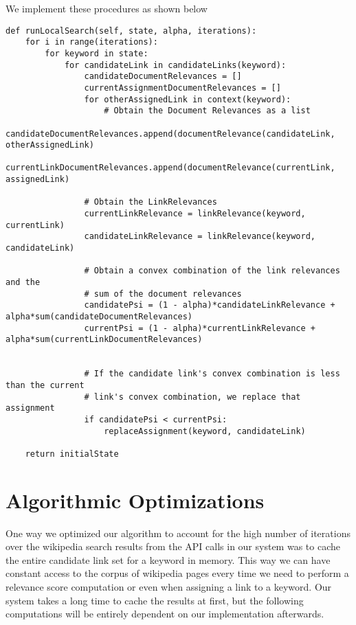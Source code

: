 \documentclass[twoside,11pt]{article}
\begin{document}
We implement these procedures as shown below

\begin{lstlisting}
def runLocalSearch(self, state, alpha, iterations):
    for i in range(iterations):
        for keyword in state:
            for candidateLink in candidateLinks(keyword):
                candidateDocumentRelevances = []
                currentAssignmentDocumentRelevances = []
                for otherAssignedLink in context(keyword):
                    # Obtain the Document Relevances as a list
                    candidateDocumentRelevances.append(documentRelevance(candidateLink, otherAssignedLink)
                    currentLinkDocumentRelevances.append(documentRelevance(currentLink, assignedLink)

                # Obtain the LinkRelevances
                currentLinkRelevance = linkRelevance(keyword, currentLink)
                candidateLinkRelevance = linkRelevance(keyword, candidateLink)

                # Obtain a convex combination of the link relevances and the
                # sum of the document relevances
                candidatePsi = (1 - alpha)*candidateLinkRelevance + alpha*sum(candidateDocumentRelevances)
                currentPsi = (1 - alpha)*currentLinkRelevance + alpha*sum(currentLinkDocumentRelevances)


                # If the candidate link's convex combination is less than the current
                # link's convex combination, we replace that assignment
                if candidatePsi < currentPsi:
                    replaceAssignment(keyword, candidateLink)

    return initialState
\end{lstlisting}

\section{Algorithmic Optimizations}

One way we optimized our algorithm to account for the high number of iterations over the wikipedia search results from the API calls in our system was to cache the entire candidate link set for a keyword in memory. This way we can have constant access to the corpus of wikipedia pages every time we need to perform a relevance score computation or even when assigning a link to a keyword. Our system takes a long time to cache the results at first, but the following computations will be entirely dependent on our implementation afterwards.
\end{document}
